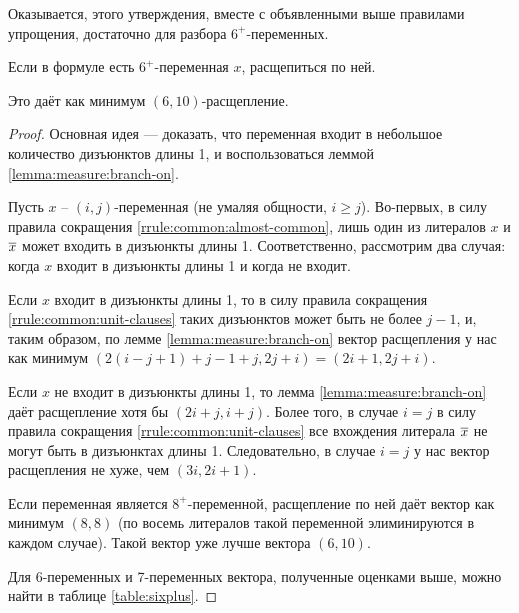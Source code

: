 Оказывается, этого утверждения, вместе с объявленными выше правилами упрощения, достаточно для разбора $6^+$-переменных.

\begin{brule}
 Если в формуле есть $6^+$-переменная $x$, расщепиться по ней.

 Это даёт как минимум $(6,10)$-расщепление.
\end{brule}

\begin{proof}
 Основная идея — доказать, что переменная входит в небольшое количество дизъюнктов длины 1, и воспользоваться леммой \ref{lemma:measure:branch-on}.

 Пусть $x$ -- $(i,j)$-переменная (не умаляя общности, $i \geq j$). Во-первых, в силу правила сокращения \ref{rrule:common:almost-common}, лишь один из литералов $x$ и $\overline{x}$ может входить в дизъюнкты длины 1. Соответственно, рассмотрим два случая: когда $x$ входит в дизъюнкты длины 1 и когда не входит.

 Если $x$ входит в дизъюнкты длины 1, то в силу правила сокращения \ref{rrule:common:unit-clauses} таких дизъюнктов может быть не более $j - 1$, и, таким образом, по лемме \ref{lemma:measure:branch-on} вектор расщепления у нас как минимум $(2(i - j + 1) + j - 1 + j, 2j + i) = (2i + 1, 2j + i)$.

 Если $x$ не входит в дизъюнкты длины 1, то лемма \ref{lemma:measure:branch-on} даёт расщепление хотя бы $(2i + j, i + j)$. Более того, в случае $i = j$ в силу правила сокращения \ref{rrule:common:unit-clauses} все вхождения литерала $\overline{x}$ не могут быть в дизъюнктах длины 1. Следовательно, в случае $i = j$ у нас вектор расщепления не хуже, чем $(3i, 2i + 1)$.

 Если переменная является $8^+$-переменной, расщепление по ней даёт вектор как минимум $(8,8)$ (по восемь литералов такой переменной элиминируются в каждом случае). Такой вектор уже лучше вектора $(6,10)$.

 Для 6-переменных и 7-переменных вектора, полученные оценками выше, можно найти в таблице \ref{table:sixplus}.


\end{proof}

